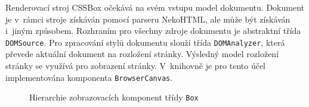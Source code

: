 Renderovací stroj CSSBox očekává na svém vstupu model dokumentu. Dokument je v~rámci stroje získáván pomocí parseru NekoHTML, ale může být získáván i~jiným způsobem. Rozhraním pro všechny zdroje dokumentu je abstraktní třída \texttt{DOMSource}. Pro zpracování stylů dokumentu slouží třída \texttt{DOMAnalyzer}, která převede aktuální dokument na rozložení stránky. Výsledný model rozložení stránky se využívá pro zobrazení stránky. V~knihovně je pro tento účel implementována komponenta \texttt{BrowserCanvas}.

\begin{figure}[H]
  \begin{center}
    \caption{Hierarchie zobrazovacích komponent třídy \texttt{Box}}
    \label{Figure.BoxHierarchy}
  \end{center}
\end{figure}

